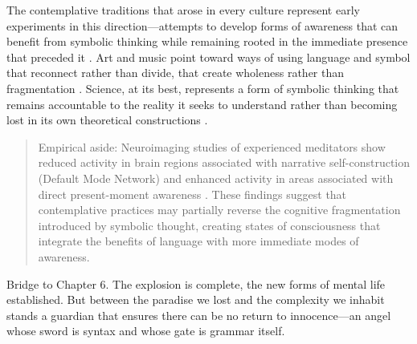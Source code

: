 The contemplative traditions that arose in every culture represent early experiments in this direction—attempts to develop forms of awareness that can benefit from symbolic thinking while remaining rooted in the immediate presence that preceded it \parencite{tang2015brain}. Art and music point toward ways of using language and symbol that reconnect rather than divide, that create wholeness rather than fragmentation \parencite{dissanayake2015art}. Science, at its best, represents a form of symbolic thinking that remains accountable to the reality it seeks to understand rather than becoming lost in its own theoretical constructions \parencite{polanyi1958personal}.

\begin{quote}\small
Empirical aside: Neuroimaging studies of experienced meditators show reduced activity in brain regions associated with narrative self-construction (Default Mode Network) and enhanced activity in areas associated with direct present-moment awareness \parencite{brewer2011meditation}. These findings suggest that contemplative practices may partially reverse the cognitive fragmentation introduced by symbolic thought, creating states of consciousness that integrate the benefits of language with more immediate modes of awareness.
\end{quote}

\bigskip
\noindent Bridge to Chapter 6. The explosion is complete, the new forms of mental life established. But between the paradise we lost and the complexity we inhabit stands a guardian that ensures there can be no return to innocence—an angel whose sword is syntax and whose gate is grammar itself.
